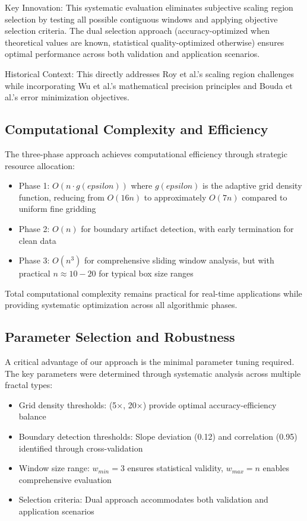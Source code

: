 \documentclass[preprint,12pt]{elsarticle}
\def\textbf#1{#1}%
\def\epsilon{epsilon}%
\begin{document}
\textbf{Key Innovation}: This systematic evaluation eliminates subjective scaling region selection by testing all possible contiguous windows and applying objective selection criteria. The dual selection approach (accuracy-optimized when theoretical values are known, statistical quality-optimized otherwise) ensures optimal performance across both validation and application scenarios.

\textbf{Historical Context}: This directly addresses Roy et al.'s scaling region challenges while incorporating Wu et al.'s mathematical precision principles and Bouda et al.'s error minimization objectives.

\subsection{Computational Complexity and Efficiency}

The three-phase approach achieves computational efficiency through strategic resource allocation:

\begin{itemize}
\item \textbf{Phase 1}: $O(n \cdot g(\epsilon))$ where $g(\epsilon)$ is the adaptive grid density function, reducing from $O(16n)$ to approximately $O(7n)$ compared to uniform fine gridding

\item \textbf{Phase 2}: $O(n)$ for boundary artifact detection, with early termination for clean data

\item \textbf{Phase 3}: $O(n^3)$ for comprehensive sliding window analysis, but with practical $n \approx 10-20$ for typical box size ranges
\end{itemize}

Total computational complexity remains practical for real-time applications while providing systematic optimization across all algorithmic phases.

\subsection{Parameter Selection and Robustness}

A critical advantage of our approach is the minimal parameter tuning required. The key parameters were determined through systematic analysis across multiple fractal types:

\begin{itemize}
\item \textbf{Grid density thresholds}: (5×, 20×) provide optimal accuracy-efficiency balance
\item \textbf{Boundary detection thresholds}: Slope deviation (0.12) and correlation (0.95) identified through cross-validation
\item \textbf{Window size range}: $w_{min} = 3$ ensures statistical validity, $w_{max} = n$ enables comprehensive evaluation
\item \textbf{Selection criteria}: Dual approach accommodates both validation and application scenarios
\end{itemize}
\end{document}
